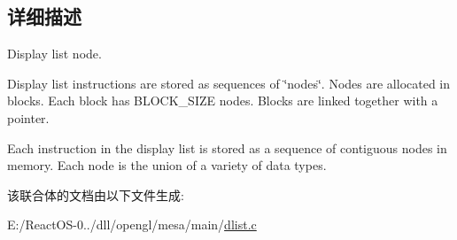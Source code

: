 \subsection{详细描述}
Display list node.

Display list instructions are stored as sequences of \char`\"{}nodes\char`\"{}. Nodes are allocated in blocks. Each block has B\+L\+O\+C\+K\+\_\+\+S\+I\+ZE nodes. Blocks are linked together with a pointer.

Each instruction in the display list is stored as a sequence of contiguous nodes in memory. Each node is the union of a variety of data types. 

该联合体的文档由以下文件生成\+:\begin{DoxyCompactItemize}
\item 
E\+:/\+React\+O\+S-\/0../dll/opengl/mesa/main/\hyperlink{dlist_8c}{dlist.\+c}\end{DoxyCompactItemize}
